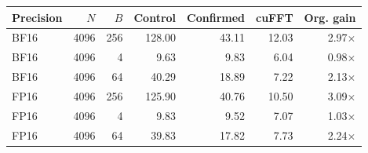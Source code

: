 \begin{tabular}{lrrrrrr}
\hline
Precision & $N$ & $B$ & Control & Confirmed & cuFFT & Org. gain \\
\hline
BF16 & 4096 & 256 & 128.00 & 43.11 & 12.03 & 2.97$\times$ \\
BF16 & 4096 & 4 & 9.63 & 9.83 & 6.04 & 0.98$\times$ \\
BF16 & 4096 & 64 & 40.29 & 18.89 & 7.22 & 2.13$\times$ \\
FP16 & 4096 & 256 & 125.90 & 40.76 & 10.50 & 3.09$\times$ \\
FP16 & 4096 & 4 & 9.83 & 9.52 & 7.07 & 1.03$\times$ \\
FP16 & 4096 & 64 & 39.83 & 17.82 & 7.73 & 2.24$\times$ \\
\hline
\end{tabular}

